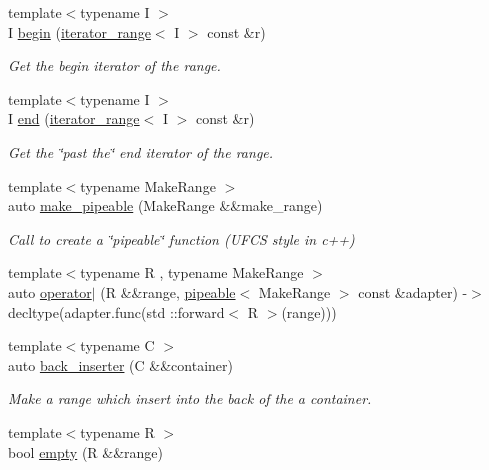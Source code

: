 \begin{DoxyCompactItemize}
{\footnotesize template$<$typename I $>$ }\\I \mbox{\hyperlink{namespacerah_a14e69321e6772651b349cb31467ea3a2}{begin}} (\mbox{\hyperlink{structrah_1_1iterator__range}{iterator\+\_\+range}}$<$ I $>$ const \&r)
\begin{DoxyCompactList}\small\item\em Get the begin iterator of the range. \end{DoxyCompactList}\item 
{\footnotesize template$<$typename I $>$ }\\I \mbox{\hyperlink{namespacerah_a6b31fe80bf81abf3149df010cb265e20}{end}} (\mbox{\hyperlink{structrah_1_1iterator__range}{iterator\+\_\+range}}$<$ I $>$ const \&r)
\begin{DoxyCompactList}\small\item\em Get the \char`\"{}past the\char`\"{} end iterator of the range. \end{DoxyCompactList}\item 
{\footnotesize template$<$typename Make\+Range $>$ }\\auto \mbox{\hyperlink{namespacerah_a9beb2a94a054fd0caefd5a20b1c0f0d9}{make\+\_\+pipeable}} (Make\+Range \&\&make\+\_\+range)
\begin{DoxyCompactList}\small\item\em Call to create a \char`\"{}pipeable\char`\"{} function (U\+F\+CS style in c++) \end{DoxyCompactList}\item 
{\footnotesize template$<$typename R , typename Make\+Range $>$ }\\auto \mbox{\hyperlink{namespacerah_ab1ae71c44092414b8a22379bc0d3cd34}{operator$\vert$}} (R \&\&range, \mbox{\hyperlink{structrah_1_1pipeable}{pipeable}}$<$ Make\+Range $>$ const \&adapter) -\/$>$ decltype(adapter.\+func(std \+::forward$<$ R $>$(range)))
\item 
{\footnotesize template$<$typename C $>$ }\\auto \mbox{\hyperlink{namespacerah_a0698f952bc3c4f1961929bbddb5812fe}{back\+\_\+inserter}} (C \&\&container)
\begin{DoxyCompactList}\small\item\em Make a range which insert into the back of the a container. \end{DoxyCompactList}\item 
{\footnotesize template$<$typename R $>$ }\\bool \mbox{\hyperlink{namespacerah_a51feb1497566c28de396f50735fd259b}{empty}} (R \&\&range)

\end{DoxyCompactItemize}
